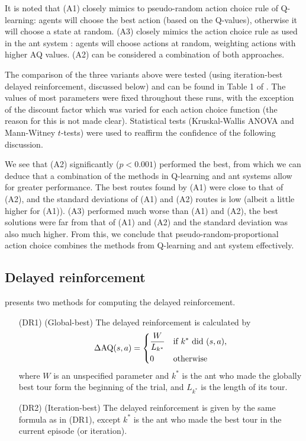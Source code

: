     It is noted that (A1) closely mimics to pseudo-random action choice rule of Q-learning: agents will choose the best action (based on the Q-values), otherwise it will choose a state at random. (A3) closely mimics the action choice rule as used in the ant system \cite{dorigo1996ant}: agents will choose actions at random, weighting actions with higher AQ values. (A2) can be considered a combination of both approaches. 
    

    The comparison of the three variants above were tested (using iteration-best delayed reinforcement, discussed below) and can be found in Table 1 of \cite{gambardella1995ant}. The values of most parameters were fixed throughout these runs, with the exception of the discount factor which was varied for each action choice function (the reason for this is not made clear). Statistical tests (Kruskal-Wallis ANOVA and Mann-Witney $t$-tests) were used to reaffirm the confidence of the following discussion.

    
We see that (A2) significantly ($p < 0.001$) performed the best, from which we can deduce that a combination of the methods in Q-learning and ant systems allow for greater performance. The best routes found by (A1) were close to that of (A2), and the standard deviations of (A1) and (A2) routes is low (albeit a little higher for (A1)). (A3) performed much worse than (A1) and (A2), the best solutions were far from that of (A1) and (A2) and the standard deviation was also much higher. From this, we conclude that pseudo-random-proportional action choice combines the methods from Q-learning and ant system effectively. 

\subsection{Delayed reinforcement}

\textcite{gambardella1995ant} presents two methods for computing the delayed reinforcement.

\begin{enumerate}
    \item[(DR1)] (Global-best) The delayed reinforcement is calculated by
        \[
            \operatorname{\Delta AQ}(s, a) = \begin{dcases}
                \dfrac{W}{L_{k^*}} & \text{if $k^*$ did $(s, a)$,} \\
                0                  & \text{otherwise}
            \end{dcases}
        \]
        where $W$ is an unspecified parameter and $k^*$ is the ant who made the globally best tour form the beginning of the trial, and $L_{k^*}$ is the length of its tour.
    \item[(DR2)] (Iteration-best) The delayed reinforcement is given by the same formula as in (DR1), except $k^*$ is the ant who made the best tour in the current episode (or iteration).
\end{enumerate}

